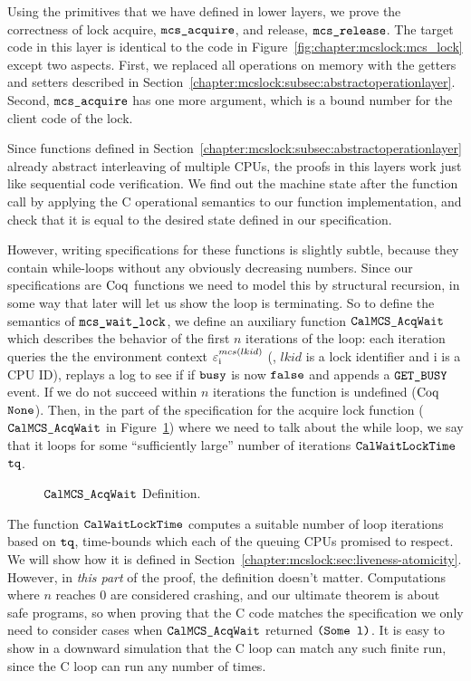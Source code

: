 Using the primitives that we have defined in lower layers, we prove the correctness of lock acquire, ${\mathrm{\texttt{mcs\_acquire}}}$, and release, ${\mathrm{\texttt{mcs\_release}}}$.
The target code in this layer is identical to the code in Figure~\ref{fig:chapter:mcslock:mcs_lock} except two aspects. 
First, we replaced all operations on memory with the getters and setters described in Section~\ref{chapter:mcslock:subsec:abstractoperationlayer}.
Second, ${\mathrm{\texttt{mcs\_acquire}}}$ has one more
 argument, which is a bound number for the client code of the lock.

Since functions defined in
Section~\ref{chapter:mcslock:subsec:abstractoperationlayer} already abstract interleaving
of multiple CPUs, the proofs in this layers work just like sequential
code verification. We find out the machine state after the function
call by applying the C operational semantics to our function
implementation, and check that it is equal to the desired state
defined in our specification.

However, writing specifications for these functions is slightly subtle, 
because they contain
while-loops without any obviously decreasing numbers. Since our
specifications are $\mathrm{Coq}$ functions we need to model this by structural
recursion, in some way that later will let us show the loop is terminating.
So to define the semantics of ${\mathrm{\texttt{mcs\_wait\_lock}}}$,
we define an auxiliary function
${\mathrm{\texttt{CalMCS\_AcqWait}}}$ which describes the
behavior of the first $n$ iterations of the loop: each iteration
queries the the environment context ${\varepsilon}^{mcs(lkid)}_{\mathrm{i}}$ (\ie,  $lkid$ is a lock identifier and $\mathrm{i}$ is a CPU ID), replays a log to see if if ${\mathrm{\texttt{busy}}}$ is now ${{\mathrm{\texttt{false}}}}$ and appends a ${\mathrm{\texttt{GET\_BUSY}}}$ event.
If we do not succeed within $n$ iterations the function is undefined ($\mathrm{Coq}$ ${\mathrm{\texttt{None}}}$).
Then, in the part of the  specification for the  acquire lock 
function (${\mathrm{\texttt{CalMCS\_AcqWait}}}$ in Figure~\ref{fig:chapter:mcslock:calmcsacqwait}) where we need to talk about the while loop,
we say that it loops for some ``sufficiently large'' 
number of iterations ${\mathrm{\texttt{CalWaitLockTime}}}$  ${\mathrm{\texttt{tq}}}$. 
\begin{figure}

\caption{${\mathrm{\texttt{CalMCS\_AcqWait}}}$ Definition.}
\label{fig:chapter:mcslock:calmcsacqwait}
\end{figure}
The function ${\mathrm{\texttt{CalWaitLockTime}}}$ computes a suitable 
number of loop iterations based on ${\mathrm{\texttt{tq}}}$, time-bounds  which each of the queuing CPUs promised to respect.
We will show how it is defined in Section~\ref{chapter:mcslock:sec:liveness-atomicity}. 
However, in \emph{this part} of the proof, the definition doesn't matter. 
Computations where $n$ reaches 0 are considered crashing, and our
ultimate theorem is about safe programs, so when proving that the C
code matches the specification we only need to 
consider cases when ${\mathrm{\texttt{CalMCS\_AcqWait}}}$ returned ${\mathrm{\texttt{(}}}{\mathrm{\texttt{Some}}}{\mathrm{\texttt{ l)}}}$.
It is easy to show in a downward simulation that the C loop can match any such finite run, 
since the C loop can run any number of times.

